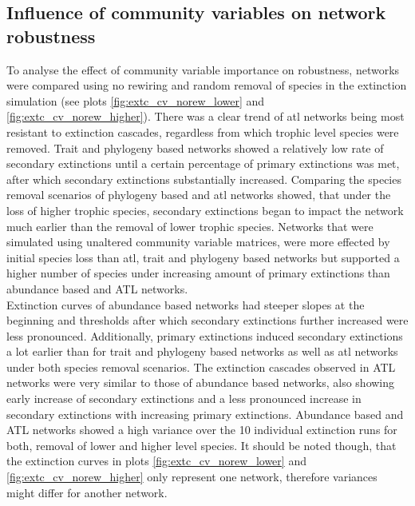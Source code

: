 \documentclass[12pt,a4paper]{article}
\begin{document}
\subsection{Influence of community variables on network robustness}
To analyse the effect of community variable importance on robustness, networks were compared using no rewiring and random removal of species in the extinction simulation (see plots \ref{fig:extc_cv_norew_lower} and \ref{fig:extc_cv_norew_higher}). There was a clear trend of atl networks being most resistant to extinction cascades, regardless from which trophic level species were removed. Trait and phylogeny based networks showed a relatively low rate of secondary extinctions until a certain percentage of primary extinctions was met, after which secondary extinctions substantially increased. Comparing the species removal scenarios of phylogeny based and atl networks showed, that under the loss of higher trophic species, secondary extinctions began to impact the network much earlier than the removal of lower trophic species. Networks that were simulated using unaltered community variable matrices, were more effected by initial species loss than atl, trait and phylogeny based networks but supported a higher number of species under increasing amount of primary extinctions than abundance based and ATL networks.\\
Extinction curves of abundance based networks had steeper slopes at the beginning and thresholds after which secondary extinctions further increased were less pronounced. Additionally, primary extinctions induced secondary extinctions a lot earlier than for trait and phylogeny based networks as well as atl networks under both species removal scenarios. The extinction cascades observed in ATL networks were very similar to those of abundance based networks, also showing early increase of secondary extinctions and a less pronounced increase in secondary extinctions with increasing primary extinctions. Abundance based and ATL networks showed a high variance over the 10 individual extinction runs for both, removal of lower and higher level species. It should be noted though, that the extinction curves in plots \ref{fig:extc_cv_norew_lower} and \ref{fig:extc_cv_norew_higher} only represent one network, therefore variances might differ for another network.

\end{document}
